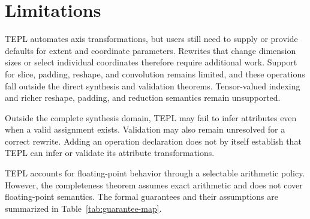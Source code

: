 \section{Limitations}
\label{sec:limitations}
TEPL automates axis transformations, but users still need to supply
or provide defaults for extent and coordinate parameters. Rewrites
that change dimension sizes or select individual coordinates therefore
require additional work. Support for slice, padding, reshape, and
convolution remains limited, and these operations fall outside the
direct synthesis and validation theorems. Tensor-valued indexing
and richer reshape, padding, and reduction semantics remain unsupported.

Outside the complete synthesis domain, TEPL may fail to infer
attributes even when a valid assignment exists. Validation may also
remain unresolved for a correct rewrite. Adding an operation declaration
does not by itself establish that TEPL can infer or validate its
attribute transformations.

TEPL accounts for floating-point behavior through a selectable
arithmetic policy. However, the completeness theorem assumes exact
arithmetic and does not cover floating-point semantics.
The formal guarantees and their assumptions are summarized in
Table~\ref{tab:guarantee-map}.
